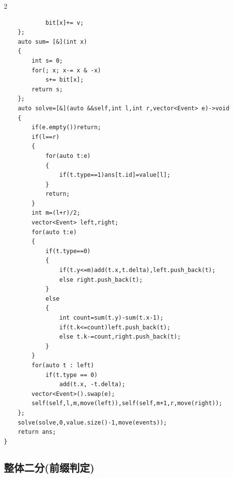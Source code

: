 \documentclass[UTF8,fontset=fandol,a4paper,twoside]{ctexart}
\begin{document}
\begin{multicols}{2}
\begin{lstlisting}
            bit[x]+= v;
    };
    auto sum= [&](int x)
    {
        int s= 0;
        for(; x; x-= x & -x)
            s+= bit[x];
        return s;
    };
    auto solve=[&](auto &&self,int l,int r,vector<Event> e)->void
    {
        if(e.empty())return;
        if(l==r)
        {
            for(auto t:e)
            {
                if(t.type==1)ans[t.id]=value[l];
            }
            return;
        }
        int m=(l+r)/2;
        vector<Event> left,right;
        for(auto t:e)
        {
            if(t.type==0)
            {
                if(t.y<=m)add(t.x,t.delta),left.push_back(t);
                else right.push_back(t);
            }
            else
            {
                int count=sum(t.y)-sum(t.x-1);
                if(t.k<=count)left.push_back(t);
                else t.k-=count,right.push_back(t);
            }
        }
        for(auto t : left)
            if(t.type == 0)
                add(t.x, -t.delta);
        vector<Event>().swap(e);
        self(self,l,m,move(left)),self(self,m+1,r,move(right));
    };
    solve(solve,0,value.size()-1,move(events));
    return ans;
}
\end{lstlisting}
\subsection{整体二分(前缀判定)}


\end{multicols}
\end{document}
